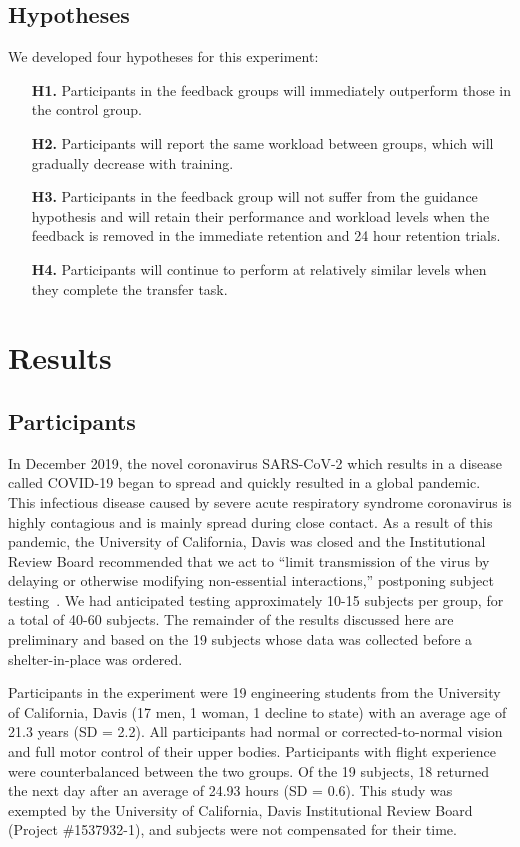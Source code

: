 \subsection{Hypotheses}
We developed four hypotheses for this experiment:
\begin{itemize}
    \item[\textbf{H1.}] Participants in the feedback groups will immediately outperform those in the control group.
    \item[\textbf{H2.}] Participants will report the same workload between groups, which will gradually decrease with training.
    \item[\textbf{H3.}] Participants in the feedback group will not suffer from the guidance hypothesis and will retain their performance and workload levels when the feedback is removed in the immediate retention and 24 hour retention trials.
    \item[\textbf{H4.}] Participants will continue to perform at relatively similar levels when they complete the transfer task.
\end{itemize}

\section{Results}
\subsection{Participants}
In December 2019, the novel coronavirus SARS-CoV-2 which results in a disease called COVID-19 began to spread and quickly resulted in a global pandemic.
This infectious disease caused by severe acute respiratory syndrome coronavirus is highly contagious and is mainly spread during close contact.
As a result of this pandemic, the University of California, Davis was closed and the Institutional Review Board recommended that we act to ``limit transmission of the virus by delaying or otherwise modifying non-essential interactions,'' postponing subject testing~\citep{mohapatra_2020}.
We had anticipated testing approximately 10-15 subjects per group, for a total of 40-60 subjects.
The remainder of the results discussed here are preliminary and based on the 19 subjects whose data was collected before a shelter-in-place was ordered.

Participants in the experiment were 19 engineering students from the University of California, Davis (17 men, 1 woman, 1 decline to state) with an average age of 21.3 years (SD = 2.2).
All participants had normal or corrected-to-normal vision and full motor control of their upper bodies.
Participants with flight experience were counterbalanced between the two groups.
Of the 19 subjects, 18 returned the next day after an average of 24.93 hours (SD = 0.6).
This study was exempted by the University of California, Davis Institutional Review Board (Project \#1537932-1), and subjects were not compensated for their time.

